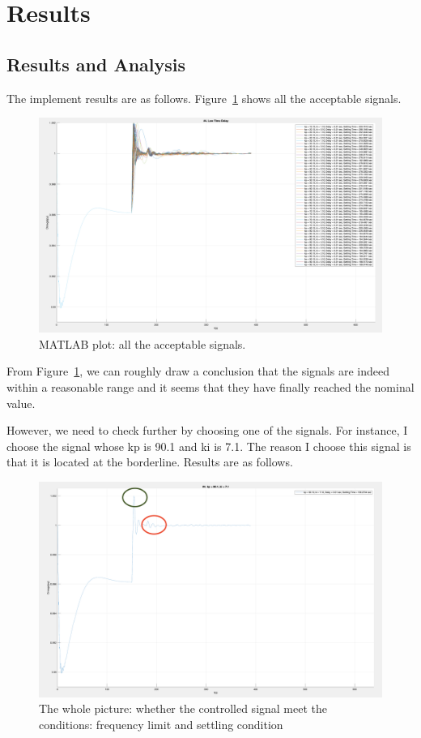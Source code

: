 \section{Results} %
\label{section4.4}
\subsection{Results and Analysis} %
The implement results are as follows. Figure~\ref{4_4_1_result1} shows all the acceptable signals.

\begin{figure}[htbp]
\centering
\includegraphics[width = .819\textwidth]{figure/4_4_1_result1.png}
\caption{MATLAB plot: all the acceptable signals.}
\label{4_4_1_result1}
\end{figure}

From Figure~\ref{4_4_1_result1}, we can roughly draw a conclusion that the signals are indeed within a reasonable range and it seems that they have finally reached the nominal value.  

However, we need to check further by choosing one of the signals. For instance, I choose the signal whose kp is 90.1 and ki is 7.1. The reason I choose this signal is that it is located at the borderline. Results are as follows.  

\begin{figure}[htbp]
\centering
\includegraphics[width = .819\textwidth]{figure/4_4_1_result2.png}
\caption{The whole picture: whether the controlled signal meet the conditions: frequency limit and settling condition}
\label{4_4_1_result2}
\end{figure}


